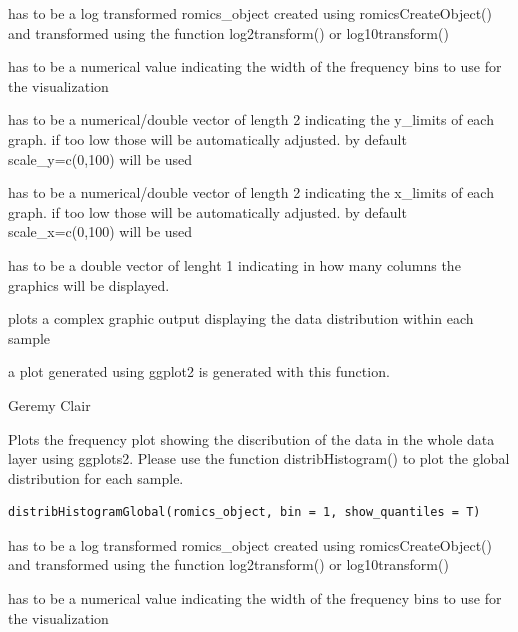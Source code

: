 \documentclass[a4paper]{book}
\begin{document}
\begin{Arguments}
\begin{ldescription}
\item[\code{romics\_object}] has to be a log transformed romics\_object created using romicsCreateObject() and transformed using the function log2transform() or log10transform()

\item[\code{bin}] has to be a numerical value indicating the width of the frequency bins to use for the visualization

\item[\code{scale\_y}] has to be a numerical/double vector of length 2 indicating the y\_limits of each graph. if too low those will be automatically adjusted. by default  scale\_y=c(0,100) will be used

\item[\code{scale\_x}] has to be a numerical/double vector of length 2 indicating the x\_limits of each graph. if too low those will be automatically adjusted. by default  scale\_x=c(0,100) will be used

\item[\code{col}] has to be a double vector of lenght 1 indicating in how many columns the graphics will be displayed.
\end{ldescription}
\end{Arguments}
%
\begin{Details}
plots a complex graphic output displaying the data distribution within each sample
\end{Details}
%
\begin{Value}
a plot generated using ggplot2 is generated with this function.
\end{Value}
%
\begin{Author}
Geremy Clair
\end{Author}
%
\begin{Description}
Plots the frequency plot showing the discribution of the data in the whole data layer using ggplots2. Please use the function distribHistogram() to plot the global distribution for each sample.
\end{Description}
%
\begin{Usage}
\begin{verbatim}
distribHistogramGlobal(romics_object, bin = 1, show_quantiles = T)
\end{verbatim}
\end{Usage}
%
\begin{Arguments}
\begin{ldescription}
\item[\code{romics\_object}] has to be a log transformed romics\_object created using romicsCreateObject() and transformed using the function log2transform() or log10transform()

\item[\code{bin}] has to be a numerical value indicating the width of the frequency bins to use for the visualization
\end{ldescription}
\end{Arguments}
\end{document}
